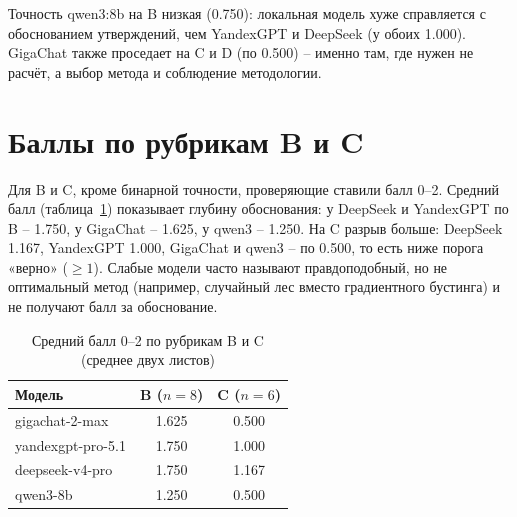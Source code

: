 \documentclass{bmstu}
\begin{document}
\begin{table}[htbp]
\centering
\caption{Точность «модель $\times$ тип задачи» [95\% ДИ]}
\label{tab:acc_model_type}
\setlength{\tabcolsep}{2pt}
\vspace{-10pt}
\end{table}


Точность qwen3:8b на B низкая (0.750): локальная модель хуже справляется с обоснованием утверждений, чем YandexGPT и DeepSeek (у обоих 1.000). GigaChat также проседает на C и D (по 0.500) -- именно там, где нужен не расчёт, а выбор метода и соблюдение методологии.

\section{Баллы по рубрикам B и C}
Для B и C, кроме бинарной точности, проверяющие ставили балл 0--2. Средний балл (таблица~\ref{tab:rubric}) показывает глубину обоснования: у DeepSeek и YandexGPT по B -- 1.750, у GigaChat -- 1.625, у qwen3 -- 1.250. На C разрыв больше: DeepSeek 1.167, YandexGPT 1.000, GigaChat и qwen3 -- по 0.500, то есть ниже порога «верно» ($\ge1$). Слабые модели часто называют правдоподобный, но не оптимальный метод (например, случайный лес вместо градиентного бустинга) и не получают балл за обоснование.

\begin{table}[htbp]
\centering
\caption{Средний балл 0--2 по рубрикам B и C (среднее двух листов)}
\label{tab:rubric}
\begin{tabular}{|l|c|c|}
\hline
Модель & B ($n=8$) & C ($n=6$) \\
\hline
gigachat-2-max & 1.625 & 0.500 \\
yandexgpt-pro-5.1 & 1.750 & 1.000 \\
deepseek-v4-pro & 1.750 & 1.167 \\
qwen3-8b & 1.250 & 0.500 \\
\hline
\end{tabular}
\vspace{-10pt}
\end{table}
\end{document}
